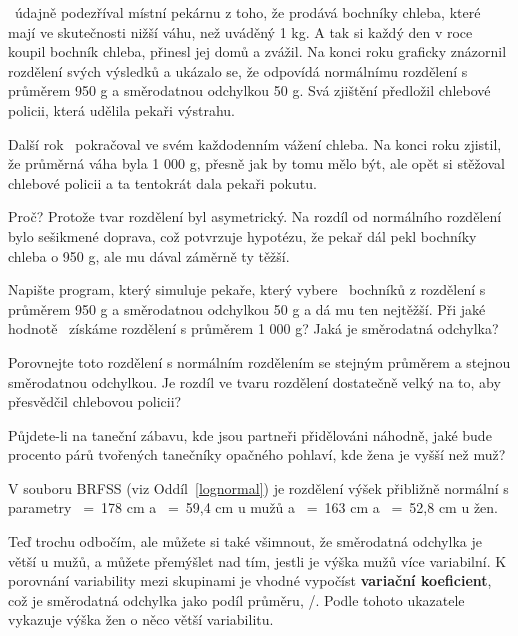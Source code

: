 \documentclass[12pt]{book}
\begin{document}
\Poincare~údajně podezříval místní pekárnu z toho, že prodává bochníky chleba, které mají ve skutečnosti nižší váhu, než uváděný 1 kg. A tak si každý den v roce koupil bochník chleba, přinesl jej domů a zvážil. Na konci roku graficky znázornil rozdělení svých výsledků a ukázalo se, že odpovídá normálnímu rozdělení s průměrem 950 g a směrodatnou odchylkou 50 g. Svá zjištění předložil chlebové policii, která udělila pekaři výstrahu.

Další rok \Poincare~pokračoval ve svém každodenním vážení chleba. Na konci roku zjistil, že průměrná váha byla 1 000 g, přesně jak by tomu mělo být, ale opět si stěžoval chlebové policii a ta tentokrát dala pekaři pokutu.

Proč?  Protože tvar rozdělení byl asymetrický. Na rozdíl od normálního rozdělení bylo sešikmené doprava, což potvrzuje hypotézu, že pekař dál pekl bochníky chleba o 950 g, ale \Poincare mu dával záměrně ty těžší.

\begin{exercise}
Napište program, který simuluje pekaře, který vybere \n~bochníků z rozdělení s průměrem 950 g a směrodatnou odchylkou 50 g a dá \Poincare mu ten nejtěžší.  Při jaké hodnotě \n~získáme rozdělení s průměrem 1 000 g?  Jaká je směrodatná odchylka?

Porovnejte toto rozdělení s normálním rozdělením se stejným průměrem a stejnou směrodatnou odchylkou. Je rozdíl ve tvaru rozdělení dostatečně velký na to, aby přesvědčil chlebovou policii?

\end{exercise}


\begin{exercise}
\label{coef_var}
Půjdete-li na taneční zábavu, kde jsou partneři přidělováni náhodně, jaké bude procento párů tvořených tanečníky opačného pohlaví, kde žena je vyšší než muž?

V souboru BRFSS (viz Oddíl~\ref{lognormal}) je rozdělení výšek přibližně normální s parametry
\mymu~=~178 cm a \sigmasq~=~59,4 cm u mužů a \mymu~=~163 cm a \sigmasq~=~52,8 cm u žen.


Teď trochu odbočím, ale můžete si také všimnout, že směrodatná odchylka je větší u mužů, a můžete přemýšlet nad tím, jestli je výška mužů více variabilní. K porovnání variability mezi skupinami je vhodné vypočíst {\bf
variační koeficient}, což je směrodatná odchylka jako podíl průměru, \mysigma/\mymu.  Podle tohoto ukazatele vykazuje výška žen o něco větší variabilitu.


\end{exercise}
\end{document}
